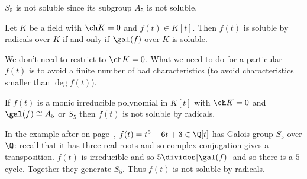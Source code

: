 \documentclass[a4paper]{article}
\begin{document}
\begin{eg}
  \(S_5\) is not soluble since its subgroup \(A_5\) is not soluble.
\end{eg}

\begin{theorem}
  \label{thm:solubility}
  Let \(K\) be a field with \(\ch K = 0\) and \(f(t) \in K[t]\). Then \(f(t)\) is soluble by radicals over \(K\) if and only if \(\gal(f)\) over \(K\) is soluble.
\end{theorem}

\begin{remark}
  We don't need to restrict to \(\ch K = 0\). What we need to do for a particular \(f(t)\) is to avoid a finite number of bad characteristics (to avoid characteristics smaller than \(\deg f(t)\)).
\end{remark}

\begin{corollary}
  If \(f(t)\) is a monic irreducible polynomial in \(K[t]\) with \(\ch K = 0\) and \(\gal(f) \cong A_5\) or \(S_5\) then \(f(t)\) is not soluble by radicals.
\end{corollary}

\begin{eg}
  In the example after  on page~\pageref{thm:galois group Sp}, \(f(t) = t^5 - 6t + 3 \in \Q[t]\) has Galois group \(S_5\) over \(\Q\): recall that it has three real roots and so complex conjugation gives a transposition. \(f(t)\) is irreducible and so \(5 \divides |\gal(f)|\) and so there is a \(5\)-cycle. Together they generate \(S_5\). Thus \(f(t)\) is not soluble by radicals.
\end{eg}
\end{document}
